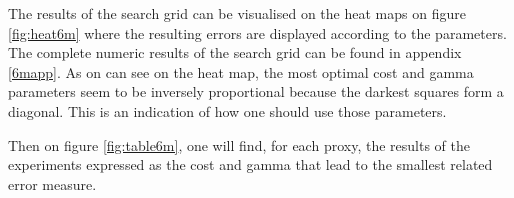\documentclass[11pt,a4paper,oneside]{book}
\begin{document}
The results of the search grid can be visualised on the heat maps on figure \ref{fig:heat6m} where the resulting errors are displayed according to the parameters. The complete numeric results of the search grid can be found in appendix \ref{6mapp}. As on can see on the heat map, the most optimal cost and gamma parameters seem to be inversely proportional because the darkest squares form a diagonal. This is an indication of how one should use those parameters.

Then on figure \ref{fig:table6m}, one will find, for each proxy, the results of the experiments expressed as the cost and gamma that lead to the smallest related error measure.


\begin{figure}[!h]
\centering
{}
\end{figure}
\end{document}
